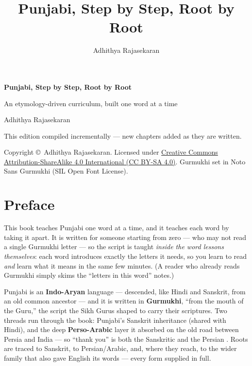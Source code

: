 \documentclass[11pt,twoside]{book}
\title{\Huge Punjabi, Step by Step, Root by Root}
\author{Adhithya Rajasekaran}
\date{}
\begin{document}
\frontmatter

\begin{titlepage}
  \centering
  \vspace*{3cm}
  {\Huge\bfseries Punjabi, Step by Step, Root by Root\par}
  \vspace{1cm}
  {\Large An etymology-driven curriculum, built one word at a time\par}
  \vspace{1.5cm}
  {\large Adhithya Rajasekaran\par}
  \vfill
  {\large This edition compiled incrementally --- new chapters added as they
  are written.\par}
  \vspace{2cm}
  {\normalsize
    Copyright \copyright\ Adhithya Rajasekaran. Licensed under
    \href{https://creativecommons.org/licenses/by-sa/4.0/}%
    {Creative Commons Attribution-ShareAlike 4.0 International (CC BY-SA 4.0)}.
    Gurmukhi set in Noto Sans Gurmukhi (SIL Open Font License).\par
  }
\end{titlepage}

\chapter*{Preface}

This book teaches Punjabi one word at a time, and it teaches each word by taking
it apart. It is written for someone starting from zero --- who may not read a
single Gurmukhi letter --- so the script is taught
\emph{inside the word lessons themselves}: each word introduces exactly the
letters it needs, so you learn to read  \emph{and} learn what it means
in the same few minutes. (A reader who already reads Gurmukhi simply skims the
``letters in this word'' notes.)

Punjabi is an \textbf{Indo-Aryan} language --- descended, like Hindi and
Sanskrit, from an old common ancestor --- and it is written in \textbf{Gurmukhi},
``from the mouth of the Guru,'' the script the Sikh Gurus shaped to carry their
scriptures. Two threads run through the book: Punjabi's Sanskrit inheritance
(shared with Hindi), and the deep \textbf{Perso-Arabic} layer it absorbed on the
old road between Persia and India --- so ``thank you'' is both the Sanskritic
 and the Persian . Roots are traced to Sanskrit, to
Persian/Arabic, and, where they reach, to the wider family that also gave
English its words --- every form supplied in full.
\end{document}
